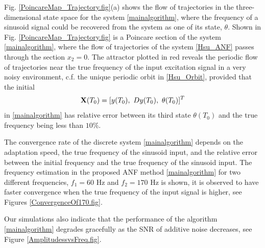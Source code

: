 \documentclass{UCF_ETD}
\begin{document}
Fig. \ref{PoincareMap_Trajectory.fig}(a) shows the
 flow of trajectories in the three-dimensional state space for the  %
  system \eqref{mainalgorithm}, where the frequency of a  sinusoid signal could be recovered from  the system as one of its state, $\theta$.
    Shown in  Fig. \ref{PoincareMap_Trajectory.fig}
    is a Poincare section \cite{lynch04} of the  %
  system \eqref{mainalgorithm},
     where the flow of trajectories of the system \eqref{Hsu_ANF} passes through the section $x_2=0$.
The attractor plotted in red reveals the periodic flow  of trajectories near the true frequency of the input excitation signal in a very noisy environment, c.f. the unique periodic orbit in \eqref{Hsu_Orbit},
provided that the initial
 \begin{equation}
 {\bf X}(T_0)=[y(T_0),\ Dy(T_0), \ \theta(T_0)]^T\end{equation}
 in \eqref{mainalgorithm}
 has
relative error between
its third state $\theta(T_0)$
 and the true frequency  being  less than $10\%$.

The convergence rate of the  discrete system \eqref{mainalgorithm} depends on the adaptation speed, the  true frequency of the sinusoid
input,  and the relative error between the initial frequency and
 the true frequency of the sinusoid input.
 The frequency estimation in the proposed ANF method \eqref{mainalgorithm} for two different frequencies, $f_1 = 60$ Hz and $f_2 = 170$ Hz is shown, it
is observed to have faster convergence  when the true frequency
 of the input signal is higher, see
Figures \ref{ConvergenceOf170.fig}.

Our simulations  also indicate that the performance of the algorithm  \eqref{mainalgorithm}
 degrades gracefully as the SNR of additive noise decreases, see Figure \ref{AmplitudessvsFreq.fig}.
  
\end{document}
